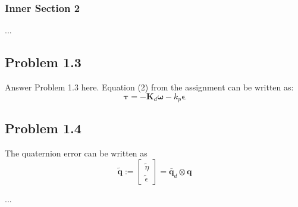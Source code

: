 \subsubsection*{Inner Section 2}
...

\subsection*{Problem 1.3}
Answer Problem 1.3 here. Equation (2) from the assignment can be written as: 
\begin{equation}
  \label{eq:tau}
  \mathbf{\tau} = -\mathbf{K}_d \boldsymbol{\omega} - k_p \boldsymbol{\epsilon}
\end{equation}

\subsection*{Problem 1.4}
The quaternion error can be written as
 \begin{equation}
	 \tilde{\mathbf{q}} := \left[
	 \begin{array}{c}
		 \tilde{\eta} \\
		 \tilde{\epsilon}
	 \end{array}
	 \right] = \bar{\mathbf{q}}_d \otimes \mathbf{q} 
	 \label{eq:q_tilde}
 \end{equation} 

...


